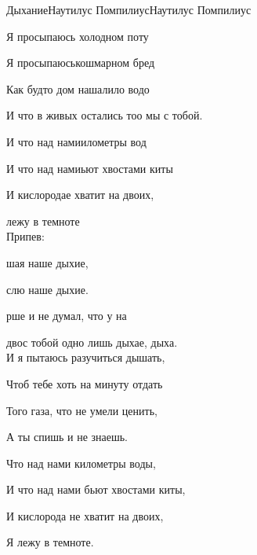 \documentclass[11pt,a5paper]{book}
\renewcommand{\tt}{\indent \indent}
\begin{document}
\begin{song}{Дыхание}{}{Наутилус Помпилиус}{Наутилус Помпилиус}{}{}

Я просыпаюсь холодном поту\par
  Я просыпаюськошмарном бред\par
  Как будто дом нашалило водо\par
  И что в живых остались тоо мы с тобой.\par
{}И что над намиилометры вод\par
  И что над намиьют хвостами киты\par
  И кислородае хватит на двоих,\par
{} лежу в темноте\\

Припев:\par
\tt{}шая наше дыхие,\par
{} слю наше дыхие.\par
{} рше и не думал, что у на\par
{} двос тобой одно лишь дыхае, дыха.\\

И я пытаюсь разучиться дышать,\par
Чтоб тебе хоть на минуту отдать\par
Того газа, что не умели ценить,\par
А ты спишь и не знаешь.\par
Что над нами километры воды,\par
И что над нами бьют хвостами киты,\par
И кислорода не хватит на двоих,\par
Я лежу в темноте.\\

\\
\end{song}
\end{document}
